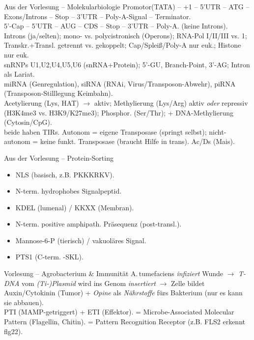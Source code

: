 

\begin{topic}[c4]{Aus der Vorlesung -- Molekularbiologie}
     Promotor(TATA) -- +1 -- 5'UTR -- ATG -- Exons/Introns -- Stop -- 3'UTR -- Poly-A-Signal -- Terminator.\\
     5'-Cap -- 5'UTR -- AUG -- CDS -- Stop -- 3'UTR -- Poly-A. (keine Introns).\\
     Introns (ja/selten); mono- vs. polycistronisch (Operons); RNA-Pol I/II/III vs. 1; Transkr.+Transl. getrennt vs. gekoppelt; Cap/Spleiß/Poly-A nur euk.; Histone nur euk.\\
     snRNPs U1,U2,U4,U5,U6 (snRNA+Protein); 5'-GU, Branch-Point, 3'-AG; Intron als Lariat.\\
     miRNA (Genregulation), siRNA (RNAi, Virus/Transposon-Abwehr), piRNA (Transposon-Stilllegung Keimbahn).\\
     Acetylierung (Lys, HAT) $\to$ aktiv; Methylierung (Lys/Arg) aktiv \emph{oder} repressiv (H3K4me3 vs. H3K9/K27me3); Phosphor. (Ser/Thr); + DNA-Methylierung (Cytosin/CpG).\\
     beide haben TIRs. Autonom = eigene Transposase (springt selbst); nicht-autonom = keine funkt. Transposase (braucht Hilfe in trans). Ac/Ds (Mais).
\end{topic}

\begin{topic}[c4]{Aus der Vorlesung -- Protein-Sorting}
    \begin{itemize}
        \item {} NLS (basisch, z.B. PKKKRKV).
        \item {} N-term. hydrophobes Signalpeptid.
        \item {} KDEL (lumenal) / KKXX (Membran).
        \item {} N-term. positive amphipath. Präsequenz (post-transl.).
        \item {} Mannose-6-P (tierisch) / vakuoläres Signal.
        \item {} PTS1 (C-term. -SKL).
    \end{itemize}
\end{topic}

\begin{topic}[c2]{Vorlesung -- Agrobacterium \& Immunität}
     A.\,tumefaciens \emph{infiziert} Wunde $\to$ \emph{T-DNA} vom \emph{(Ti-)Plasmid} wird ins Genom \emph{insertiert} $\to$ Zelle bildet Auxin/Cytokinin (Tumor) + \emph{Opine} als \emph{Nährstoffe} fürs Bakterium (nur es kann sie abbauen).\\
     PTI (MAMP-getriggert) + ETI (Effektor).  = Microbe-Associated Molecular Pattern (Flagellin, Chitin).  = Pattern Recognition Receptor (z.B. FLS2 erkennt flg22).
\end{topic}

